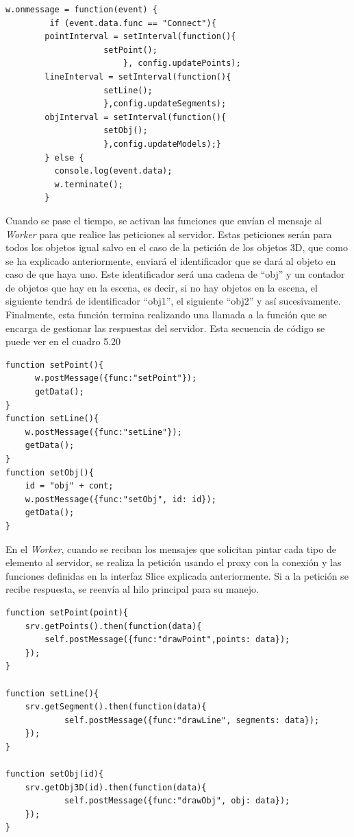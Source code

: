 \begin{lstlisting}[caption= Código para crear las llamadas periódicas a las funciones encargadas de realizar las peticiones al servidor, label=cod.funcionesinterval]
w.onmessage = function(event) {
      	 if (event.data.func == "Connect"){
		pointInterval = setInterval(function(){
					setPoint();
						}, config.updatePoints);
		lineInterval = setInterval(function(){
					setLine();
					},config.updateSegments);
		objInterval = setInterval(function(){
					setObj();
					},config.updateModels);}	
        } else {
          console.log(event.data);
          w.terminate();
        }
\end{lstlisting}

Cuando se pase el tiempo, se activan las funciones que envían el mensaje al \textit{Worker} para que realice las peticiones al servidor. Estas peticiones serán para todos los objetos igual salvo en el caso de la petición de los objetos 3D, que como se ha explicado anteriormente, enviará el identificador que se dará al objeto en caso de que haya uno. Este identificador será una cadena de ``obj'' y un contador de objetos que hay en la escena, es decir, si no hay objetos en la escena, el siguiente tendrá de identificador ``obj1'', el siguiente ``obj2'' y así sucesivamente. Finalmente, esta función termina realizando una llamada a la función que se encarga de gestionar las respuestas del servidor. Esta secuencia de código se puede ver en el cuadro 5.20

\begin{lstlisting}[caption= Definición de las funciones de petición, label=cod.funcionespeticion]
function setPoint(){
      w.postMessage({func:"setPoint"});
      getData();
}
function setLine(){
	w.postMessage({func:"setLine"});
	getData();
}
function setObj(){
	id = "obj" + cont;
	w.postMessage({func:"setObj", id: id});
	getData();
}
\end{lstlisting}

En el \textit{Worker}, cuando se reciban los mensajes que solicitan pintar cada tipo de elemento al servidor, se realiza la petición usando el proxy con la conexión y las funciones definidas en la interfaz Slice explicada anteriormente. Si a la petición se recibe respuesta, se reenvía al hilo principal para su manejo.

\begin{lstlisting}[caption= Código que realiza las peticiones al servidor, label=cod.peticiones]
function setPoint(point){
 	srv.getPoints().then(function(data){
		self.postMessage({func:"drawPoint",points: data});
	});
}

function setLine(){
	srv.getSegment().then(function(data){
      		self.postMessage({func:"drawLine", segments: data});
  	});
}

function setObj(id){
  	srv.getObj3D(id).then(function(data){
    		self.postMessage({func:"drawObj", obj: data});
  	});
}
\end{lstlisting}

